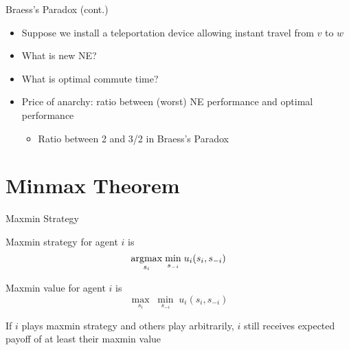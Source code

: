 \documentclass[11pt,aspectratio=169,handout]{beamer}
\begin{document}
  \begin{frame}{Braess's Paradox (cont.)}
   \begin{center}
   \end{center}
   \begin{itemize}
    \item Suppose we install a teleportation device allowing instant travel from $v$ to $w$
    \item What is new NE? 
    \item What is optimal commute time?
    \item \alert{Price of anarchy}: ratio between (worst) NE performance and optimal performance
    \begin{itemize}[<+->]
     \item Ratio between 2 and 3/2 in Braess's Paradox
    \end{itemize}
   \end{itemize}
  \end{frame}
  
 \section{Minmax Theorem} 
  \begin{frame}{Maxmin Strategy}
   \begin{itemizes}
    \item \alert{Maxmin strategy} for agent $i$ is 
    $$\underset{s_i}{\operatorname*{argmax}} \; \underset{s_{-i}}{\min} \; u_i(s_i,s_{-i})$$
    \item Maxmin value for agent $i$ is 
    $$\underset{s_i}{\max} \; \underset{s_{-i}}{\min} \; u_i(s_i,s_{-i})$$
    \item If $i$ plays maxmin strategy and others play arbitrarily, $i$ still receives expected payoff of at least their maxmin value
   \end{itemizes}
  \end{frame}
  
\end{document}
